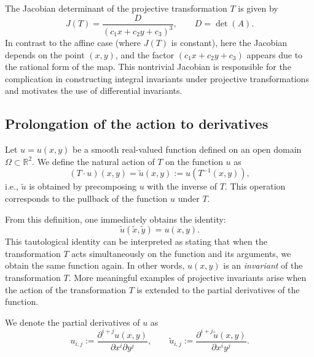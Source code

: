 \documentclass[12pt,reqno]{amsart}
\begin{document}


The Jacobian determinant of the projective transformation $T$ is given by
\begin{equation*}%
J(T) = \frac{D}{(c_1 x + c_2 y + c_3)^3}, \qquad  D=\det(A).
\end{equation*}
In contrast to the affine case (where $J(T)$ is constant), here the Jacobian depends on the point $(x, y)$, and the factor $(c_1 x + c_2 y + c_3)$ appears due to the rational form of the map. This nontrivial Jacobian is responsible for the complication in constructing integral invariants under projective transformations and motivates the use of differential invariants.




\subsection{Prolongation of the action to derivatives}

Let $u = u(x,y)$ be a smooth real-valued function defined on an open domain $\Omega \subset \mathbb{R}^2$. %
 We define the natural action of $T$ on the function $u$ as
\[
(T \cdot u)(x,y) = \tilde u(x,  y) := u(T^{-1}(x,y)),
\]
i.e., $\tilde u$ is obtained by precomposing $u$ with the inverse of $T$. This operation corresponds to the pullback of the function $u$ under $T$.

From this definition, one immediately obtains the  identity:
\begin{equation}\label{eq:T-inv}
\tilde u\left(\tilde x, \tilde y \right) = u(x,y).
\end{equation}
This tautological identity can be interpreted as stating that when the transformation $T$ acts simultaneously on the function and its arguments, we obtain the same function again. In other words, $u(x,y)$ is an \textit{invariant} of the transformation $T$. More meaningful examples of projective invariants arise when the action of the transformation $T$ is extended to the partial derivatives of the function.

We denote the partial derivatives of $u$ as
\[
u_{i,j} := \frac{\partial^{i+j} u(x,y)}{\partial x^i\partial y^j}, \qquad
\tilde u_{i,j} := \frac{\partial^{i+j} \tilde u( x,  y)}{\partial   x^i    y^j}.
\]
\end{document}
